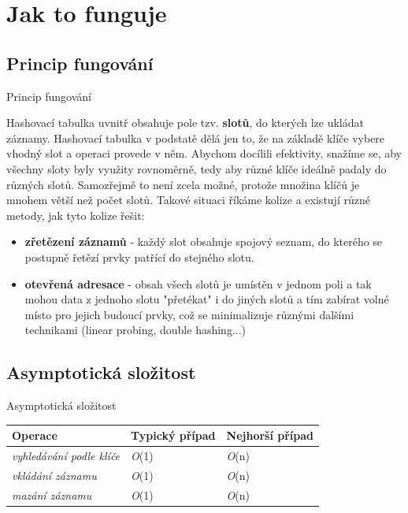 \documentclass[utf8x]{beamer}
\begin{document}
\section{Jak to funguje}

\subsection{Princip fungování}

\begin{frame}{Princip fungování}

  Hashovací tabulka uvnitř obsahuje pole tzv. \textbf{slotů}, do kterých lze ukládat záznamy. Hashovací tabulka v podstatě dělá jen to, že na základě klíče vybere vhodný slot a operaci provede v něm. Abychom docílili efektivity, snažíme se, aby všechny sloty byly využity rovnoměrně, tedy aby různé klíče ideálně padaly do různých slotů. Samozřejmě to není zcela možné, protože množina klíčů je mnohem větší než počet slotů. Takové situaci říkáme kolize a existují různé metody, jak tyto kolize řešit:
  \pause
    
  \begin{itemize}[<+->]
  \item {   
    \textbf{zřetězení záznamů} - každý slot obsahuje spojový seznam, do kterého se postupně řetězí prvky patřící do stejného slotu.
  }
  \item {   
     \textbf{otevřená adresace} - obsah všech slotů je umístěn v jednom poli a tak mohou data z jednoho slotu "přetékat" i do jiných slotů a tím zabírat volné místo pro jejich budoucí prvky, což se minimalizuje různými dalšími technikami (linear probing, double hashing...)
  }
  
  \end{itemize}
\end{frame}

\subsection{Asymptotická složitost}

\begin{frame}{Asymptotická složitost}

\begin{table}[]
\begin{tabular}{|l|l|l|}
\hline
\textbf{Operace} & \textbf{Typický případ} & \textbf{Nejhorší případ} \\ \hline
\textit{vyhledávání podle klíče} & \textit{O}(1)         & \textit{O}(n)          \\ \hline
\textit{vkládání záznamu} & \textit{O}(1)         & \textit{O}(n)          \\ \hline
\textit{mazání záznamu} & \textit{O}(1)         & \textit{O}(n)         \\ \hline
\end{tabular}
\end{table}

\end{frame}
\end{document}
